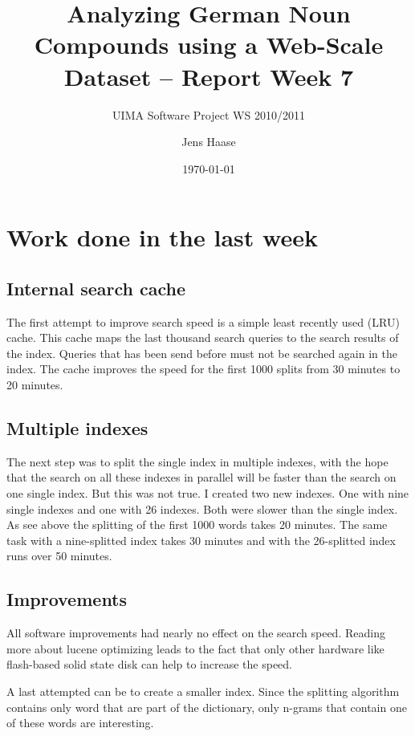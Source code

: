 \documentclass[11pt, accentcolor=tud9b, nochapname]{tudexercise}
\begin{document}
\author{Jens Haase}
\title{Analyzing German Noun Compounds using a
  Web-Scale Dataset -- Report Week 7}
\subtitle{UIMA Software Project WS 2010/2011}
\date{\today}
\maketitle

\section{Work done in the last week}

\subsection{Internal search cache}
The first attempt to improve search speed is a simple least recently used (LRU) cache. This cache maps the last thousand search queries to the search results of the index. Queries that has been send before must not be searched again in the index. The cache improves the speed for the first 1000 splits from 30 minutes to 20 minutes.

\subsection{Multiple indexes}
The next step was to split the single index in multiple indexes, with the hope that the search on all these indexes in parallel will be faster than the search on one single index. But this was not true. I created two new indexes. One with nine single indexes and one with 26 indexes. Both were slower than the single index. As see above the splitting of the first 1000 words takes 20 minutes. The same task with a nine-splitted index takes 30 minutes and with the 26-splitted index runs over 50 minutes.

\subsection{Improvements}
All software improvements had nearly no effect on the search speed. Reading more about lucene optimizing leads to the fact that only other hardware like flash-based solid state disk can help to increase the speed.

A last attempted can be to create a smaller index. Since the splitting algorithm contains only word that are part of the dictionary, only n-grams that contain one of these words are interesting.
\end{document}
